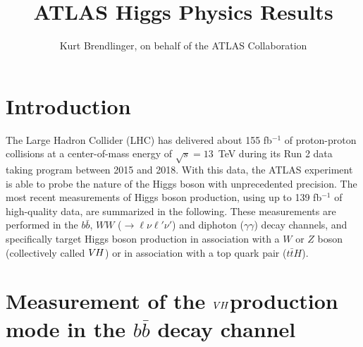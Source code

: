 \documentclass{moriond}
\def\vh{\texorpdfstring{\ensuremath{V\kern -0.1em H}\xspace}{VH\xspace}}
\begin{document}

\vspace*{4cm}
\title{ATLAS Higgs Physics Results}

\author{ Kurt Brendlinger, on behalf of the ATLAS Collaboration }

\address{~\\DESY, Notkestra\ss e 85,\\ 22607 Hamburg, Germany}

\maketitle{}

\section{Introduction}

The Large Hadron Collider (LHC) \cite{Evans:2008zzb} has delivered about 155 fb$^{-1}$ of proton-proton
collisions at a center-of-mass energy of $\sqrt{s}=13$~TeV during its Run 2 data taking program
between 2015 and 2018.
With this data, the
ATLAS experiment \cite{PERF-2007-01,ATLAS-TDR-19} is able to probe the nature of the Higgs boson with unprecedented
precision. The most recent measurements of Higgs boson production, using up
to 139 fb$^{-1}$ of high-quality data, are summarized in the following. These measurements are performed in the $b\bar b$,
$WW$ (${\rightarrow}\ell\nu\ell'\nu'$) and diphoton ($\gamma\gamma$) decay channels, and specifically
target Higgs boson production in association with a $W$ or $Z$ boson (collectively called \vh) or in association with a top
quark pair ($t\bar tH$).

\section{Measurement of the \vh production mode in the $b\bar b$ decay channel}\label{sec:vh_bb}
\end{document}

